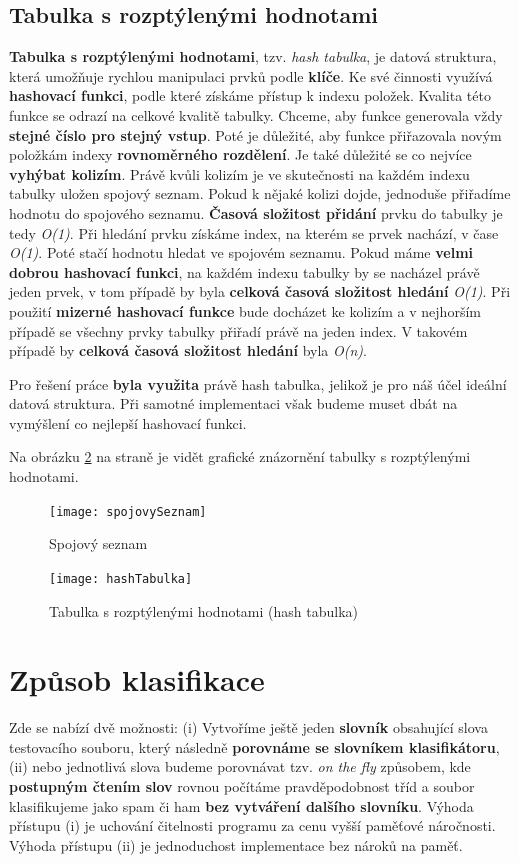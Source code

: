 \documentclass[12pt]{report}
\begin{document}
		\subsection{Tabulka s rozptýlenými hodnotami}
		\textbf{Tabulka s rozptýlenými hodnotami}, tzv. \textit{hash tabulka}, je datová struktura, která umožňuje rychlou manipulaci prvků podle \textbf{klíče}. Ke své činnosti využívá \textbf{hashovací funkci}, podle které získáme přístup k indexu položek. Kvalita této funkce se odrazí na celkové kvalitě tabulky. Chceme, aby funkce generovala vždy \textbf{stejné číslo pro stejný vstup}. Poté je důležité, aby funkce přiřazovala novým položkám indexy \textbf{rovnoměrného rozdělení}. Je také důležité se co nejvíce \textbf{vyhýbat kolizím}. Právě kvůli kolizím je ve skutečnosti na každém indexu tabulky uložen spojový seznam. Pokud k nějaké kolizi dojde, jednoduše přiřadíme hodnotu do spojového seznamu. \textbf{Časová složitost přidání} prvku do tabulky je tedy \textit{O(1)}. Při hledání prvku získáme index, na kterém se prvek nachází, v čase \textit{O(1)}. Poté stačí hodnotu hledat ve spojovém seznamu. Pokud máme \textbf{velmi dobrou hashovací funkci}, na každém indexu tabulky by se nacházel právě jeden prvek, v tom případě by byla \textbf{celková časová složitost hledání} \textit{O(1)}. Při použití \textbf{mizerné hashovací funkce} bude docházet ke kolizím a v nejhorším případě se všechny prvky tabulky přiřadí právě na jeden index. V takovém případě by \textbf{celková časová složitost hledání} byla \textit{O(n)}.
		
		Pro řešení práce \textbf{byla využita} právě hash tabulka, jelikož je pro náš účel ideální datová struktura. Při samotné implementaci však budeme muset dbát na vymýšlení co nejlepší hashovací funkci.
		
		Na obrázku \ref{fig:hashTabulka} na straně \pageref{fig:hashTabulka} je vidět grafické znázornění tabulky s rozptýlenými hodnotami.

		\begin{figure}
			\centering
			\texttt{[image: spojovySeznam]}
			\caption{Spojový seznam}
			\label{fig:spojovySeznam}
		\end{figure}

		\begin{figure}
			\centering
			\texttt{[image: hashTabulka]}
			\caption{Tabulka s rozptýlenými hodnotami (hash tabulka)}
			\label{fig:hashTabulka}
		\end{figure}
	
	\section{Způsob klasifikace}
	\label{klasifikace}
	Zde se nabízí dvě možnosti: (i) Vytvoříme ještě jeden \textbf{slovník} obsahující slova testovacího souboru, který následně \textbf{porovnáme se slovníkem klasifikátoru}, (ii) nebo jednotlivá slova budeme porovnávat tzv. \textit{on the fly} způsobem, kde \textbf{postupným čtením slov} rovnou počítáme pravděpodobnost tříd a soubor klasifikujeme jako spam či ham \textbf{bez vytváření dalšího slovníku}. Výhoda přístupu (i) je uchování čitelnosti programu za cenu vyšší paměťové náročnosti. Výhoda přístupu (ii) je jednoduchost implementace bez nároků na paměť.
	
\end{document}
